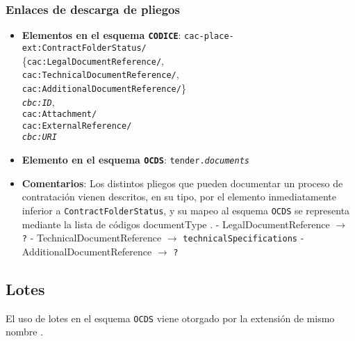         \subsubsection{Enlaces de descarga de pliegos}
            \begin{itemize}
                \item \textbf{Elementos en el esquema \texttt{CODICE}}:
                    \tabto{7.7cm} \texttt{cac-place-ext:ContractFolderStatus/} \\
                    \tabto{7.7cm} \{\texttt{cac:LegalDocumentReference/}, \\
                    \tabto{7.7cm} \texttt{cac:TechnicalDocumentReference/}, \\
                    \tabto{7.7cm} \texttt{cac:AdditionalDocumentReference/}\} \\
                    \tabto{7.7cm} \texttt{\textit{cbc:ID}},\\
                    \tabto{7.7cm} \texttt{cac:Attachment/} \\
                    \tabto{7.7cm} \texttt{cac:ExternalReference/} \\
                    \tabto{7.7cm} \texttt{\textit{cbc:URI}}
                \item \textbf{Elemento en el esquema \texttt{OCDS}}:
                    \tabto{7.7cm} \texttt{tender.\textit{documents}}
                \item \textbf{Comentarios}: Los distintos pliegos que pueden documentar un proceso de contratación vienen descritos, en su tipo, por el elemento inmediatamente inferior a \texttt{ContractFolderStatus}, y su mapeo al esquema \texttt{OCDS} se representa mediante la lista de códigos documentType \cite{CR5}.
                        \subitem - LegalDocumentReference $\rightarrow$ \texttt{?}
                        \subitem - TechnicalDocumentReference $\rightarrow$ \texttt{technicalSpecifications}
                        \subitem - AdditionalDocumentReference $\rightarrow$ \texttt{?}
            \end{itemize}

    \vspace{0.3cm}
    
    \subsection{Lotes}
        
        El uso de lotes en el esquema \texttt{OCDS} viene otorgado por la extensión de mismo nombre \cite{CR6}.
    
